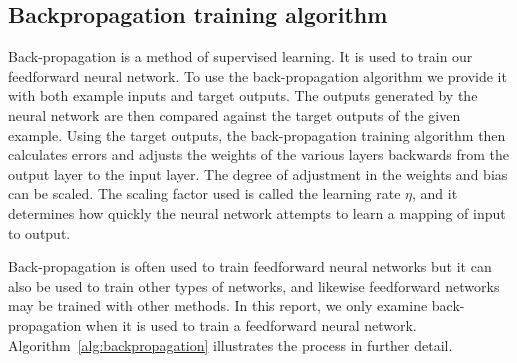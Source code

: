 \documentclass[11pt]{article}
\begin{document}

\subsection{Backpropagation training algorithm} %
\label{sub:backpropagation_training_algorithm}

Back-propagation is a method of supervised learning. It is used to train our feedforward neural network. To use the back-propagation
algorithm we provide it with both example inputs and target outputs. The outputs generated by the neural network are then compared
against the target outputs of the given example. Using the target outputs, the back-propagation training algorithm then calculates
errors and adjusts the weights of the various layers backwards from the output layer to the input layer. The degree of adjustment in the
weights and bias can be scaled. The scaling factor used is called the learning rate $\eta$, and it determines how quickly the neural
network attempts to learn a mapping of input to output.

Back-propagation is often used to train feedforward neural networks but it can also be used to train other types of networks, and
likewise feedforward networks may be trained with other methods. In this report, we only examine back-propagation when it is used to
train a feedforward neural network. Algorithm~\ref{alg:backpropagation} illustrates the process in further detail.
\end{document}
